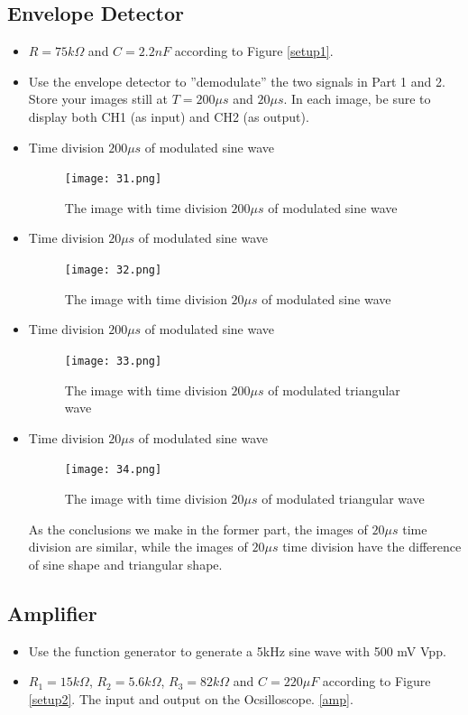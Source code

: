 \documentclass[utf8]{article}
\begin{document}
\subsection{Envelope Detector}
\begin{itemize}
\item $R = 75 k\Omega$ and $C = 2.2nF$ according to Figure \ref{setup1}.
\item Use the envelope detector to ”demodulate” the two signals in Part 1 and 2. Store your images still at $T = 200\mu s$ and $20\mu s$. In each image, be sure to display both CH1 (as input) and CH2 (as output).
\item Time division $200\mu s$ of modulated sine wave
\begin{figure}[htbp]
	\centering
		\texttt{[image: 31.png]}
		\label{fig-3-1}
	\caption{The image with time division $200\mu s$ of modulated sine wave}
\end{figure}

\item Time division $20\mu s$ of modulated sine wave
\begin{figure}[htbp]
	\centering
		\texttt{[image: 32.png]}
		\label{fig-3-2}
	\caption{The image with time division $20\mu s$ of modulated sine wave}
\end{figure}

\item Time division $200\mu s$ of modulated sine wave
\begin{figure}[htbp]
	\centering
		\texttt{[image: 33.png]}
		\label{fig-3-3}
	\caption{The image with time division $200\mu s$ of modulated triangular wave}
\end{figure}

\item Time division $20\mu s$ of modulated sine wave
\begin{figure}[htbp]
	\centering
		\texttt{[image: 34.png]}
		\label{fig-3-4}
	\caption{The image with time division $20\mu s$ of modulated triangular wave}
\end{figure}
As the conclusions we make in the former part, the images of $20\mu s$ time division are similar, while the images of $20\mu s$ time division have the difference of sine shape and triangular shape.
\end{itemize}


\subsection{Amplifier}
\begin{itemize}
\item  Use the function generator to generate a 5kHz sine wave with 500 mV Vpp.
\item  $R_1 = 15k\Omega$, $R_2 = 5.6k\Omega$, $R_3 = 82k\Omega$ and $C = 220\mu F$ according to Figure \ref{setup2}. The input and output on the Ocsilloscope.  \ref{amp}.
\end{itemize}
\end{document}
